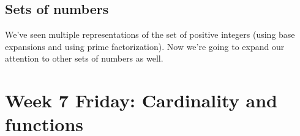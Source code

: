 \newpage
\subsection*{Sets of numbers}

We've seen multiple representations of the set of positive integers
(using base expansions and using prime factorization). Now we're 
going to expand our attention to other sets of numbers as well.




\newpage

\section*{Week 7 Friday: Cardinality and functions}

%




\newpage

\newpage




%
\newpage




\vfill

\vfill
%

\vfill




\newpage
